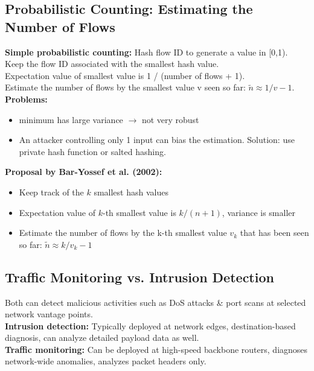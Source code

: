 \documentclass[11pt,oneside,a4paper]{article}
\begin{document}
\subsection{Probabilistic Counting: Estimating the Number of Flows}

\textbf{Simple probabilistic counting:} Hash flow ID to generate a value in [0,1). Keep the flow ID associated with the smallest hash value.\\
Expectation value of smallest value is 1 / (number of flows + 1).\\
Estimate the number of flows by the smallest value v seen so far: $\tilde{n} \approx 1/v - 1$.\\

\textbf{Problems:}
\vspace{-\topsep}
\begin{itemize}
	\setlength{\itemsep}{0pt}
	\setlength{\parskip}{0pt}
	\item minimum has large variance $\rightarrow$ not very robust
	\item An attacker controlling only 1 input can bias the estimation. Solution: use private hash function or salted hashing.
\end{itemize}
\vspace{-\topsep}

\textbf{Proposal by Bar-Yossef et al. (2002):}

\vspace{-\topsep}
\begin{itemize}
	\setlength{\itemsep}{0pt}
	\setlength{\parskip}{0pt}
	\item Keep track of the $k$ smallest hash values
	\item Expectation value of $k$-th smallest value is $k/(n+1)$, variance is smaller
	\item Estimate the number of flows by the k-th smallest value $v_k$ that has been seen
	so far: $\tilde{n} \approx k / v_k - 1$
\end{itemize}
\vspace{-\topsep}

\subsection{Traffic Monitoring vs. Intrusion Detection}

Both can detect malicious activities such as DoS attacks \& port scans at selected network
vantage points.\\
\textbf{Intrusion detection:} Typically deployed at network edges, destination-based diagnosis, can analyze detailed payload data as well.\\
\textbf{Traffic monitoring:} Can be deployed at high-speed backbone routers, diagnoses network-wide anomalies, analyzes packet headers only.
\end{document}
